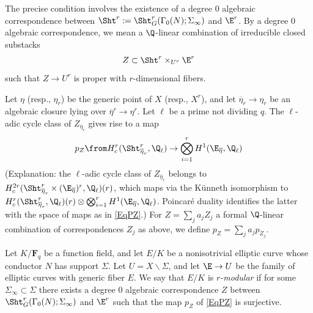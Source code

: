 \documentclass{article}
\def\F{\mathbf{F}}
\begin{document}
The precise condition involves the existence of a degree 0 algebraic correspondence between $\Sht^r:=\Sht^r_G(\Gamma_0(N);\Sigma_\infty)$ and $\E^r$.  By a degree 0 algebraic correspondence, we mean a $\Q$-linear combination of irreducible closed substacks
\[ Z\subset \Sht^r \times_{U^r} \E^r\]
such that $Z\to U^r$ is proper with $r$-dimensional fibers.  

Let $\eta$ (resp., $\eta_r$) be the generic point of $X$ (resp., $X^r$), and let $\overline{\eta}_r\to \eta_r$ be an algebraic closure lying over $\overline{\eta}^r\to \eta^r$. 
Let $\ell$ be a prime not dividing $q$.  The $\ell$-adic cycle class of $Z_{\overline{\eta}_r}$ gives rise to a map
\begin{equation}
\label{EqPZ}
 p_Z\from H^r_c(\Sht^r_{\overline{\eta}_r},\Q_\ell)\to \bigotimes_{i=1}^r H^1(\E_{\overline{\eta}},\Q_\ell)
 \end{equation}
(Explanation:  the $\ell$-adic cycle class of $Z_{\overline{\eta}_r}$ belongs to $H^{2r}_c(\Sht^r_{\overline{\eta}_r}\times (\E_{\overline{\eta}})^r,\Q_\ell)(r)$, which maps via the K\"unneth isomorphism to $H^r_c(\Sht^r_{\overline{\eta}_r},\Q_\ell)(r)\otimes \bigotimes_{i=1}^r H^1(\E_{{\overline{\eta}}},\Q_\ell)$.  Poincar\'e duality identifies the latter with the space of maps as in \eqref{EqPZ}.)  For $Z=\sum_j a_j Z_j$ a formal $\Q$-linear combination of correspondences $Z_j$ as above, we define $p_Z=\sum_j a_j p_{Z_j}$. 

\begin{defn}\label{DefnRModularity} Let $K/\F_q$ be a function field, and let $E/K$ be a nonisotrivial elliptic curve whose conductor $N$
has support $\Sigma$.  Let $U=X\smallsetminus \Sigma$, and let $\E\to U$ be the family of elliptic curves with generic fiber $E$.  We say that $E/K$ is {\em $r$-modular} if for some $\Sigma_\infty\subset \Sigma$ there exists a degree 0 algebraic correspondence $Z$ between $\Sht^r_G(\Gamma_0(N);\Sigma_\infty)$ and $\E^r$ such that the map $p_Z$ of \eqref{EqPZ} is surjective.
\end{defn}
\end{document}
